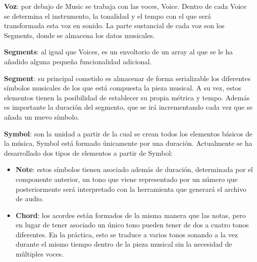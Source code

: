 \textbf{Voz}: por debajo de Music se trabaja con las voces, Voice. Dentro de cada Voice se determina el instrumento, la tonalidad y el tempo con el que será transformada esta voz en sonido. La parte sustancial de cada voz son los Segments, donde se almacena los datos musicales.
\newline

\textbf{Segments}: al igual que Voices, es un envoltorio de un array al que se le ha añadido alguna pequeña funcionalidad adicional.
\newline

\textbf{Segment}: su principal cometido es almacenar de forma serializable los diferentes símbolos musicales de los que está compuesta la pieza musical. A su vez, estos elementos tienen la posibilidad de establecer su propia métrica y tempo. Además es importante la duración del segmento, que se irá incrementando cada vez que se añada un nuevo símbolo.
\newline

\textbf{Symbol}: son la unidad a partir de la cual se crean todos los elementos básicos de la música, Symbol está formado únicamente por una duración. Actualmente se ha desarrollado dos tipos de elementos a partir de Symbol:
\begin{itemize}

	\item \textbf{Note}: estos símbolos tienen asociado además de duración, determinada por el componente anterior, un tono que viene representado por un número que posteriormente será interpretado con la herramienta que generará el archivo de audio.

	\item \textbf{Chord}: los acordes están formados de la misma manera que las notas, pero en lugar de tener asociado un único tono pueden tener de dos a cuatro tonos diferentes. En la práctica, esto se traduce a varios tonos sonando a la vez durante el mismo tiempo dentro de la pieza musical sin la necesidad de múltiples voces.

\end{itemize}
 
